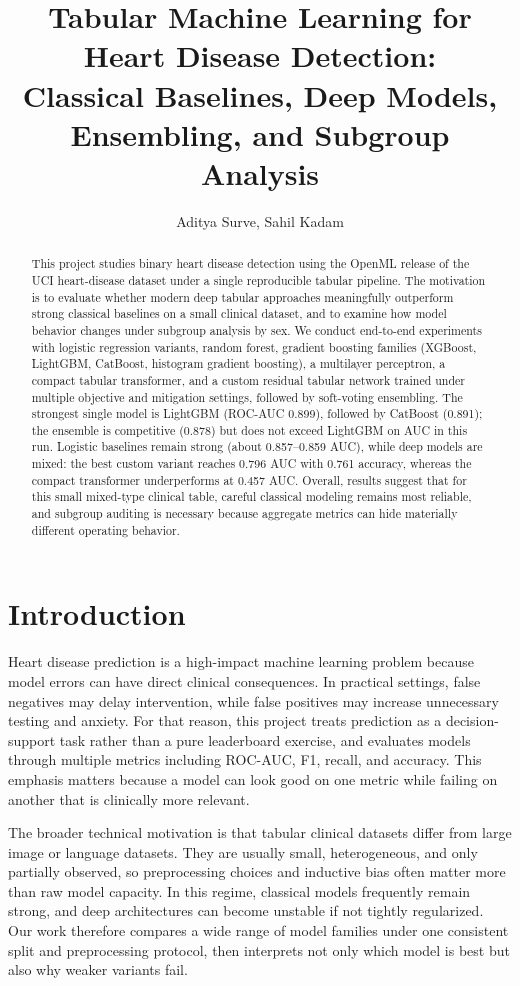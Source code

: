 ﻿\documentclass[11pt]{article}
\title{Tabular Machine Learning for Heart Disease Detection:\\Classical Baselines, Deep Models, Ensembling, and Subgroup Analysis}
\author{Aditya Surve, Sahil Kadam}
\date{}
\begin{document}
\maketitle

\begin{abstract}
This project studies binary heart disease detection using the OpenML release of the UCI heart-disease dataset under a single reproducible tabular pipeline. The motivation is to evaluate whether modern deep tabular approaches meaningfully outperform strong classical baselines on a small clinical dataset, and to examine how model behavior changes under subgroup analysis by sex. We conduct end-to-end experiments with logistic regression variants, random forest, gradient boosting families (XGBoost, LightGBM, CatBoost, histogram gradient boosting), a multilayer perceptron, a compact tabular transformer, and a custom residual tabular network trained under multiple objective and mitigation settings, followed by soft-voting ensembling. The strongest single model is LightGBM (ROC-AUC 0.899), followed by CatBoost (0.891); the ensemble is competitive (0.878) but does not exceed LightGBM on AUC in this run. Logistic baselines remain strong (about 0.857--0.859 AUC), while deep models are mixed: the best custom variant reaches 0.796 AUC with 0.761 accuracy, whereas the compact transformer underperforms at 0.457 AUC. Overall, results suggest that for this small mixed-type clinical table, careful classical modeling remains most reliable, and subgroup auditing is necessary because aggregate metrics can hide materially different operating behavior.
\end{abstract}

\section{Introduction}
Heart disease prediction is a high-impact machine learning problem because model errors can have direct clinical consequences. In practical settings, false negatives may delay intervention, while false positives may increase unnecessary testing and anxiety. For that reason, this project treats prediction as a decision-support task rather than a pure leaderboard exercise, and evaluates models through multiple metrics including ROC-AUC, F1, recall, and accuracy. This emphasis matters because a model can look good on one metric while failing on another that is clinically more relevant.

The broader technical motivation is that tabular clinical datasets differ from large image or language datasets. They are usually small, heterogeneous, and only partially observed, so preprocessing choices and inductive bias often matter more than raw model capacity. In this regime, classical models frequently remain strong, and deep architectures can become unstable if not tightly regularized. Our work therefore compares a wide range of model families under one consistent split and preprocessing protocol, then interprets not only which model is best but also why weaker variants fail.
\end{document}
